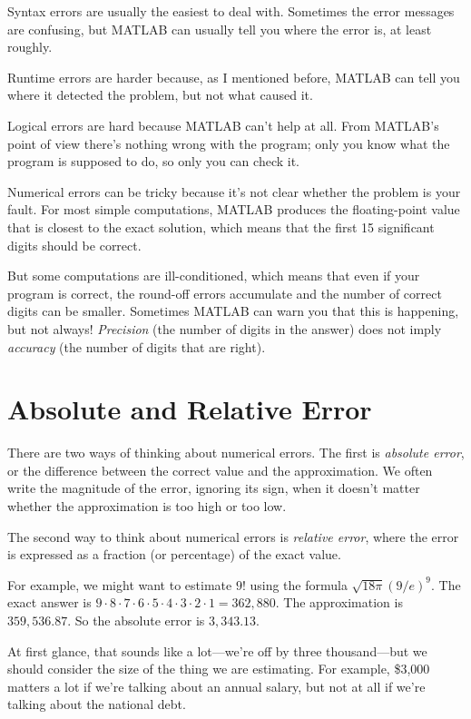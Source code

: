 Syntax errors are usually the easiest to deal with.  Sometimes the error messages
are confusing, but MATLAB can usually tell you where the error is, at
least roughly.

Runtime errors are harder because, as I mentioned before, MATLAB
can tell you where it detected the problem, but not what caused it.

Logical errors are hard because MATLAB can't help at all.
From MATLAB's point of view there's nothing wrong with the program; only you
know what the program is supposed to do, so only you can check it.


Numerical errors can be tricky because it's not clear whether the
problem is your fault.  For most simple computations, MATLAB produces
the floating-point value that is closest to the exact solution, which
means that the first 15 significant digits should be correct.

But some computations are ill-conditioned, which means that even if your program is correct, the round-off errors accumulate and the number of correct digits can be smaller.  Sometimes MATLAB can warn you that
this is happening, but not always!  \emph{Precision} (the number of digits
in the answer) does not imply \emph{accuracy} (the number of digits that
are right).


\section{Absolute and Relative Error}

There are two ways of thinking about numerical errors.
The first is \emph{absolute error}, or the difference between the correct value and the approximation.  We often write the magnitude of the error,
ignoring its sign, when it doesn't matter whether the approximation
is too high or too low.
 

The second way to think about numerical errors is \emph{relative error}, where the error is expressed as a fraction (or percentage) of the exact value.

For example, we might want to estimate $9!$ using the formula
$\sqrt {18 \pi} ( 9 / e)^9$.  The exact answer is $9 \cdot 8 \cdot 7 \cdot 6
\cdot 5 \cdot 4 \cdot 3 \cdot 2 \cdot 1 = 362,880$.  The approximation
is $359,536.87$.  So the absolute error is $3,343.13$.

At first glance, that sounds like a lot---we're off by three
thousand---but we should consider the size of the
thing we are estimating.  For example, \$3,000 matters a lot
if we're talking about an annual salary, but not at all if we're talking about the national debt.

